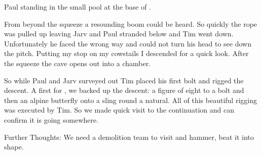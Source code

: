\begin{marginfigure}
\checkoddpage \ifoddpage \forcerectofloat \else \forceversofloat \fi
\centering
 \caption{Paul standing in the small pool at the base of . }
 \label{dangermouse pool}
\end{marginfigure}

From beyond the squeeze a resounding boom could be heard. So quickly the rope was pulled up leaving Jarv and Paul stranded below and Tim went down. Unfortunately he faced the wrong way and could not turn his head to see down the pitch. Putting my stop on my cowstails I descended for a
quick look. After the squeeze the cave opens out into a chamber.

So while Paul and Jarv surveyed out Tim placed his first bolt and rigged the descent. A first for , we backed up the descent: a figure of eight to a bolt and then an alpine butterfly onto a sling round a natural. All of this beautiful rigging was executed by Tim. So we made quick visit to the continuation and can confirm it is going somewhere.

Further Thoughts: We need a demolition team to visit  and hammer, beat it into shape.



